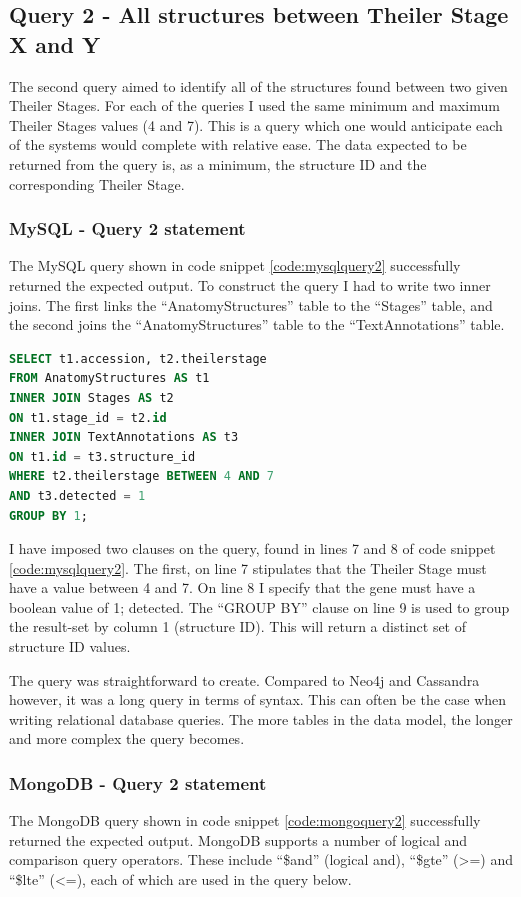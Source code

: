 \subsection*{Query 2 - All structures between Theiler Stage X and Y}\label{query2}
The second query aimed to identify all of the structures found between two given Theiler Stages. For each of the queries I used the same minimum and maximum Theiler Stages values (4 and 7). This is a query which one would anticipate each of the systems would complete with relative ease. The data expected to be returned from the query is, as a minimum, the structure ID and the corresponding Theiler Stage. 
\newpage
\subsubsection*{MySQL - Query 2 statement}\label{mysqlquery2statement}
The MySQL query shown in code snippet \ref{code:mysqlquery2} successfully returned the expected output. To construct the query I had to write two inner joins. The first links the ``AnatomyStructures'' table to the ``Stages'' table, and the second joins the ``AnatomyStructures'' table to the ``TextAnnotations'' table.

\begin{lstlisting}[language=SQL, caption=MySQL query 2 statement. All structures between Theiler Stage X and Y., label=code:mysqlquery2]
SELECT t1.accession, t2.theilerstage
FROM AnatomyStructures AS t1
INNER JOIN Stages AS t2
ON t1.stage_id = t2.id
INNER JOIN TextAnnotations AS t3
ON t1.id = t3.structure_id
WHERE t2.theilerstage BETWEEN 4 AND 7
AND t3.detected = 1
GROUP BY 1;
\end{lstlisting}

I have imposed two clauses on the query, found in lines 7 and 8 of code snippet \ref{code:mysqlquery2}. The first, on line 7 stipulates that the Theiler Stage must have a value between 4 and 7. On line 8 I specify that the gene must have a boolean value of 1; detected. The ``GROUP BY'' clause on line 9 is used to group the result-set by column 1 (structure ID). This will return a distinct set of structure ID values.

The query was straightforward to create. Compared to Neo4j and Cassandra however, it was a long query in terms of syntax. This can often be the case when writing relational database queries. The more tables in the data model, the longer and more complex the query becomes.

\subsubsection*{MongoDB - Query 2 statement}\label{mongoquery2statement}
The MongoDB query shown in code snippet \ref{code:mongoquery2} successfully returned the expected output. MongoDB supports a number of logical and comparison query operators. These include ``\$and'' (logical and), ``\$gte'' (>=) and ``\$lte'' (<=), each of which are used in the query below.

